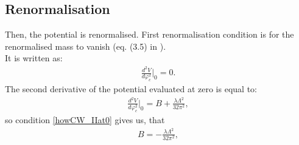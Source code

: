 \subsection{Renormalisation}
Then, the potential is renormalised. First renormalisation condition is for the 
renormalised mass to vanish (eq. (3.5) in \cite{Coleman1973}). \\
It is written as:
\begin{align}\label{howCW_IIat0}
\frac{d^2V}{d\varphi_c^2}\Big|_0=0.
\end{align}
The second derivative of the potential evaluated at zero is equal to:
\begin{align}
\frac{d^2V}{d\varphi_c^2}\Big|_0 = B+\frac{\lambda\Lambda^2}{32\pi^2},
\end{align}
so condition \ref{howCW_IIat0} gives us, that 
\begin{align}
B = -\frac{\lambda\Lambda^2}{32\pi^2},
\end{align}

